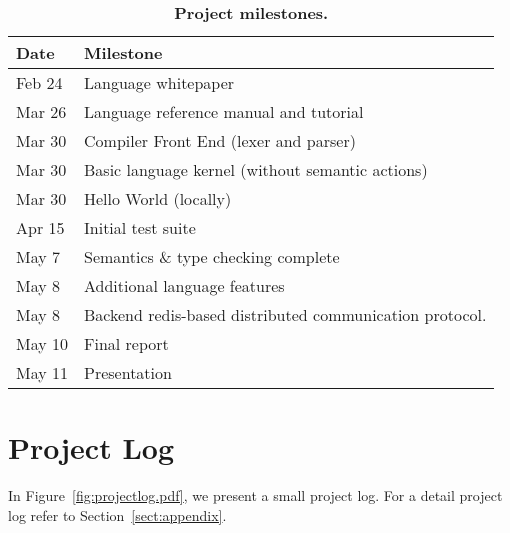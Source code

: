 \begin{table}[!h]
{
 \begin{center}
    \begin{tabular}{ | l || l |}
    \hline
    \textbf{Date} & \textbf{Milestone}\\
    \hline
    \hline
    Feb 24 &  Language whitepaper\\ \hline
    Mar 26 &  Language reference manual and tutorial\\ \hline
    Mar 30 &  Compiler Front End (lexer and parser)\\ \hline
    Mar 30 &  Basic language kernel (without semantic actions)\\ \hline
    Mar 30 &  Hello World (locally)\\ \hline
    Apr 15 &  Initial test suite \\ \hline
    May 7 &  Semantics \& type checking complete \\ \hline
    May 8 &  Additional language features \\ \hline
    May 8 &  Backend redis-based distributed communication protocol.\\ \hline
    May 10 &  Final report\\ \hline
    May 11 &  Presentation\\ \hline
    \hline
    \end{tabular}
    \caption{\textbf{Project milestones.}}
    \label{tab:milestones}
 \end{center}
}
\end{table}


\section{Project Log}
In Figure~\ref{fig:projectlog.pdf}, we present a small project log.
For a detail project log refer to Section~\ref{sect:appendix}.


